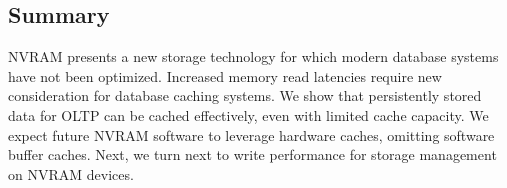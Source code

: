 \subsection{Summary}
\label{sec:OLTP_eval:Reads:Summary}
NVRAM presents a new storage technology for which modern database systems have not been optimized.
Increased memory read latencies require new consideration for database caching systems.
We show that persistently stored data for OLTP can be cached effectively, even with limited cache capacity.
We expect future NVRAM software to leverage hardware caches, omitting software buffer caches.
Next, we turn next to write performance for storage management on NVRAM devices.
